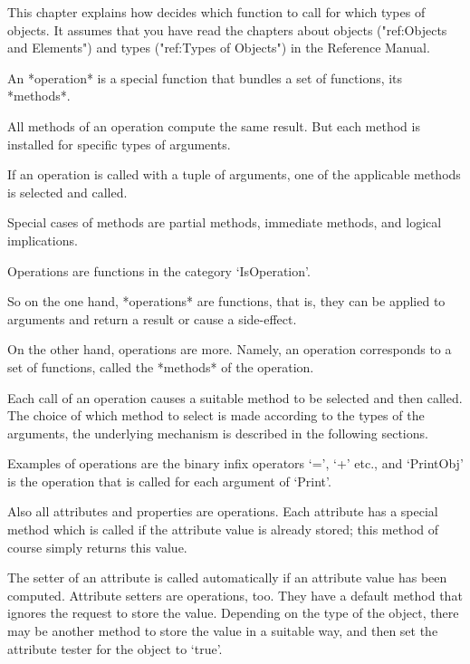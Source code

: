 

This chapter explains how {\GAP} decides which function to call for which
types of objects.
It assumes that you have read the chapters about objects
("ref:Objects and Elements") and types ("ref:Types of Objects") in the
Reference Manual.

An *operation* is a special {\GAP} function that bundles a set of
functions, its *methods*.

All methods of an operation compute the same result.
But each method is installed for specific types of arguments.

If an operation is called with a tuple of arguments,
one of the applicable methods is selected and called.

Special cases of methods are partial methods, immediate methods,
and logical implications.


Operations are functions in the category `IsOperation'.

So on the one hand, *operations* are {\GAP} functions, that is,
they can be applied to arguments and return a result or cause a
side-effect.

On the other hand, operations are more.
Namely, an operation corresponds to a set of {\GAP} functions,
called the *methods* of the operation.

Each call of an operation causes a suitable method to be selected
and then called.
The choice of which method to select is made according to the types
of the arguments,
the underlying mechanism is described in the following sections.

Examples of operations are the binary infix operators `=', `+' etc.,
and `PrintObj' is the operation that is called for each argument of
`Print'.

Also all attributes and properties are operations.
Each attribute has a special method which is called
if the attribute value is already stored;
this method of course simply returns this value.

The setter of an attribute is called automatically
if an attribute value has been computed.
Attribute setters are operations, too.
They have a default method that ignores the request to store the value.
Depending on the type of the object,
there may be another method to store the value in a suitable way,
and then set the attribute tester for the object to `true'.


